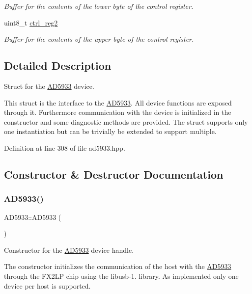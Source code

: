 \begin{DoxyCompactItemize}
\begin{DoxyCompactList}\small\item\em Buffer for the contents of the lower byte of the control register. \end{DoxyCompactList}\item 
uint8\+\_\+t \mbox{\hyperlink{struct_a_d5933_ad69ea003f71612df5cdcaddd3cfb32dd}{ctrl\+\_\+reg2}}
\begin{DoxyCompactList}\small\item\em Buffer for the contents of the upper byte of the control register. \end{DoxyCompactList}\end{DoxyCompactItemize}


\subsection{Detailed Description}
Struct for the \mbox{\hyperlink{struct_a_d5933}{A\+D5933}} device. 

This struct is the interface to the \mbox{\hyperlink{struct_a_d5933}{A\+D5933}}. All device functions are exposed through it. Furthermore communication with the device is initialized in the constructor and some diagnostic methods are provided. The struct supports only one instantiation but can be trivially be extended to support multiple. 

Definition at line 308 of file ad5933.\+hpp.



\subsection{Constructor \& Destructor Documentation}
\mbox{\label{struct_a_d5933_a968eabd26cf109703c52274218f1caac}} 
\subsubsection{\texorpdfstring{A\+D5933()}{AD5933()}}
{\footnotesize\ttfamily A\+D5933\+::\+A\+D5933 (\begin{DoxyParamCaption}{ }\end{DoxyParamCaption})}



Constructor for the \mbox{\hyperlink{struct_a_d5933}{A\+D5933}} device handle. 

The constructor initializes the communication of the host with the \mbox{\hyperlink{struct_a_d5933}{A\+D5933}} through the F\+X2\+LP chip using the libusb-\/1. library. As implemented only one device per host is supported. 

